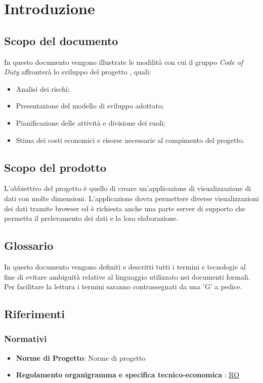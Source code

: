 \section{Introduzione}
\subsection{Scopo del documento}
	In questo documento vengono illustrate le modilità con cui il gruppo \emph{Code of Duty} affronterà lo sviluppo del progetto \hd, quali:
	\begin{itemize}
    		\item Analisi dei rischi;
    		\item Presentazione del modello di sviluppo adottato;
    		\item Pianificazione delle attività e divisione dei ruoli;
    		\item Stima dei costi economici e risorse necessarie al compimento del progetto.
	\end{itemize}
\subsection{Scopo del prodotto}
	L'obbiettivo del progetto è quello di creare un'applicazione di visualizzazione di dati con molte dimensioni. L'applicazione dovra permettere diverse visualizzazioni dei dati tramite browser ed è richiesta anche una parte server di supporto che permetta il prelevamento dei dati e la loro elaborazione.
\subsection{Glossario}
	In questo documento vengono definiti e descritti tutti i termini e tecnologie al fine di evitare ambiguità relative al linguaggio utilizzato nei documenti formali. Per facilitare la lettura i termini saranno contrassegnati da una 'G' a pedice.  
\subsection{Riferimenti}
	\subsubsection{Normativi}
		\begin{itemize}
			\item \textbf{Norme di Progetto}: Norme di progetto
			\item \textbf{Regolamento organigramma e specifica tecnico-economica} : \href{https://www.math.unipd.it/~tullio/IS-1/2020/Progetto/RO.html}{RO}
		\end{itemize}
